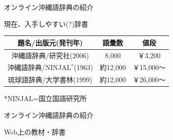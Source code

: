 \documentclass[14pt]{beamer}
\begin{document}
\begin{frame}{オンライン沖縄語辞典の紹介}
  \begin{block}{現在、入手しやすい(?)辞書}
    \begin{table}[ht]
      \begin{tabular}{|c|c|c|} 
        \hline
        題名/出版元(発刊年) & 語彙数 & 値段  \\ [0.5ex] 
        \hline\hline
        沖縄語辞典/研究社(2006) & 8,000 & ￥3,200  \\
        \hline
        沖縄語辞典/NINJAL$^*$(1963) & 約12,000 & ￥15,000〜  \\
        \hline
        琉球語辞典/大学書林(1999) & 約12,000 & ￥26,000〜 \\
        \hline
        \hline
      \end{tabular}
    \end{table}
    *NINJAL=国立国語研究所
  \end{block}
\end{frame}

\begin{frame}{オンライン沖縄語辞典の紹介}
  \begin{block}{Web上の教材・辞書}
    \begin{table}[ht]
    \end{table}
  \end{block}
\end{frame}
\end{document}
